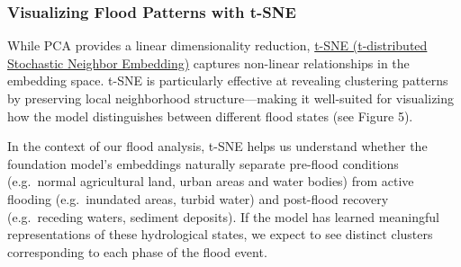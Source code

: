 \documentclass[
  letterpaper,
  DIV=11,
  numbers=noendperiod]{scrreprt}
\begin{document}
\subsubsection{Visualizing Flood Patterns with
t-SNE}\label{visualizing-flood-patterns-with-t-sne}

While PCA provides a linear dimensionality reduction,
\href{https://scikit-learn.org/stable/modules/generated/sklearn.manifold.TSNE.html}{t-SNE
(t-distributed Stochastic Neighbor Embedding)} captures non-linear
relationships in the embedding space. t-SNE is particularly effective at
revealing clustering patterns by preserving local neighborhood
structure---making it well-suited for visualizing how the model
distinguishes between different flood states (see Figure 5).

In the context of our flood analysis, t-SNE helps us understand whether
the foundation model's embeddings naturally separate pre-flood
conditions (e.g.~normal agricultural land, urban areas and water bodies)
from active flooding (e.g.~inundated areas, turbid water) and post-flood
recovery (e.g.~receding waters, sediment deposits). If the model has
learned meaningful representations of these hydrological states, we
expect to see distinct clusters corresponding to each phase of the flood
event.
\end{document}
